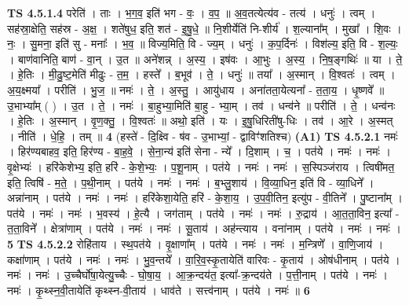 \documentclass[17pt]{extarticle}
\begin{document}
                  \newline
                                \textbf{ TS 4.5.1.4} \newline
                  परेति॑ । ताः । भ॒ग॒व॒ इति॑ भग - वः॒ । व॒प॒ ॥ अ॒व॒तत्येत्य॑व - तत्य॑ । धनुः॑ । त्वम् । सह॑स्रा॒क्षेति॒ सह॑स्र - अ॒क्ष॒ । शते॑षुध॒ इति॒ शत॑ - इ॒षु॒धे॒ ॥ नि॒शीर्येति॑ नि-शीर्य॑ । श॒ल्याना᳚म् । मुखा᳚ । शि॒वः । नः॒ । सु॒मना॒ इति॑ सु - मनाः᳚ । भ॒व॒ ॥ विज्य॒मिति॒ वि - ज्य॒म् । धनुः॑ । क॒प॒र्दिनः॑ । विश॑ल्य॒ इति॒ वि - श॒ल्यः॒ । बाण॑वानिति॒ बाण॑ - वा॒न् । उ॒त ॥ अने॑शन्न् । अ॒स्य॒ । इष॑वः । आ॒भुः । अ॒स्य॒ । नि॒ष॒ङ्गथिः॑ ॥ या । ते॒ । हे॒तिः । मी॒ढु॒ष्ट॒मेति॑ मीढुः - त॒म॒ । हस्ते᳚ । ब॒भूव॑ । ते॒ । धनुः॑ ॥ तया᳚ । अ॒स्मान् । वि॒श्वतः॑ । त्वम् । अ॒य॒क्ष्मया᳚ । परीति॑ । भु॒ज॒ ॥ नमः॑ । ते॒ । अ॒स्तु॒ । आयु॑धाय । अना॑तता॒येत्यना᳚ - त॒ता॒य॒ । धृ॒ष्णवे᳚ ॥ उ॒भाभ्या᳚म् ( ) । उ॒त । ते॒ । नमः॑ । बा॒हुभ्या॒मिति॑ बा॒हु - भ्या॒म् । तव॑ । धन्व॑ने ॥ परीति॑ । ते॒ । धन्व॑नः । हे॒तिः । अ॒स्मान् । वृ॒ण॒क्तु॒ । वि॒श्वतः॑ ॥ अथो॒ इति॑ । यः । इ॒षु॒धिरिती॑षु-धिः । तव॑ । आ॒रे । अ॒स्मत् । नीति॑ । धे॒हि॒ । तम् ॥ \textbf{  4} \newline
                  \newline
                      (हस्ते॑ - दि॒क्ष्वि - ष॑व - उ॒भाभ्यां॒ - द्वाविꣳ॑शतिश्च)  \textbf{(A1)} \newline \newline
                                \textbf{ TS 4.5.2.1} \newline
                  नमः॑ । हिर॑ण्यबाहव॒ इति॒ हिर॑ण्य - बा॒ह॒वे॒ । से॒ना॒न्य॑ इति॑ सेना - न्ये᳚ । दि॒शाम् । च॒ । पत॑ये । नमः॑ । नमः॑ । वृ॒क्षेभ्यः॑ । हरि॑केशेभ्य॒ इति॒ हरि॑ - के॒शे॒भ्यः॒ । प॒शू॒नाम् । पत॑ये । नमः॑ । नमः॑ । स॒स्पिञ्ज॑राय । त्विषी॑मत॒ इति॒ त्विषि॑ - म॒ते॒ । प॒थी॒नाम् । पत॑ये । नमः॑ । नमः॑ । ब॒भ्लु॒शाय॑ । वि॒व्या॒धिन॒ इति॑ वि - व्या॒धिने᳚ । अन्ना॑नाम् । पत॑ये । नमः॑ । नमः॑ । हरि॑केशा॒येति॒ हरि॑ - के॒शा॒य॒ । उ॒प॒वी॒तिन॒ इत्यु॑प - वी॒तिने᳚ । पु॒ष्टाना᳚म् । पत॑ये । नमः॑ । नमः॑ । भ॒वस्य॑ । हे॒त्यै । जग॑ताम् । पत॑ये । नमः॑ । नमः॑ । रु॒द्राय॑ । आ॒त॒ता॒विन॒ इत्या᳚ - त॒ता॒विने᳚ । क्षेत्रा॑णाम् । पत॑ये । नमः॑ । नमः॑ । सू॒ताय॑ । अह॑न्त्याय । वना॑नाम् । पत॑ये । नमः॑ । नमः॑ । \textbf{  5} \newline
                  \newline
                                \textbf{ TS 4.5.2.2} \newline
                  रोहि॑ताय । स्थ॒पत॑ये । वृ॒क्षाणा᳚म् । पत॑ये । नमः॑ । नमः॑ । म॒न्त्रिणे᳚ । वा॒णि॒जाय॑ । कक्षा॑णाम् । पत॑ये । नमः॑ । नमः॑ । भु॒व॒न्तये᳚ । वा॒रि॒व॒स्कृ॒तायेति॑ वारिवः - कृ॒ताय॑ । ओष॑धीनाम् । पत॑ये । नमः॑ । नमः॑ । उ॒च्चैर्घो॑षा॒येत्यु॒च्चैः - घो॒षा॒य॒ । आ॒क्र॒न्दय॑त॒ इत्या᳚-क्र॒न्दय॑ते । प॒त्ती॒नाम् । पत॑ये । नमः॑ । नमः॑ । कृ॒थ्स्न॒वी॒तायेति॑ कृथ्स्न-वी॒ताय॑ । धाव॑ते । सत्त्व॑नाम् । पत॑ये । नमः॑ ॥ \textbf{  6} \newline
\end{document}
